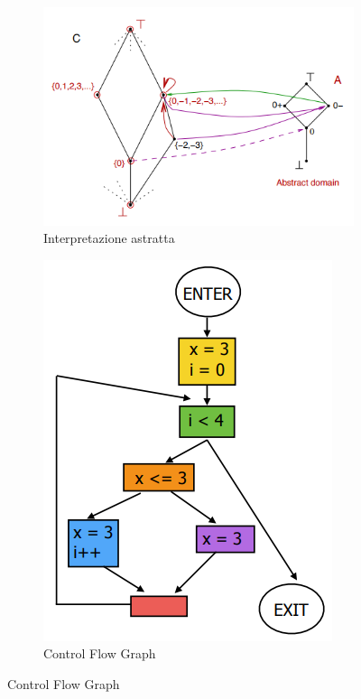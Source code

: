 \documentclass[a4paper,oneside,titlepage]{book}
\begin{document}
\begin{figure}[htp]
	\begin{subfigure}{0.49\textwidth}
	    \centering
		\includegraphics[width=\textwidth, height=\textheight, keepaspectratio]{absInt.png} 
		\caption{Interpretazione astratta}
	\end{subfigure}
	\hfill
	\begin{subfigure}{0.49\textwidth}
	    \centering
		\includegraphics[width=\textwidth, height=\textheight, keepaspectratio]{cfg.png} 
		\caption{Control Flow Graph}
	\end{subfigure}
\end{figure}
\end{document}

